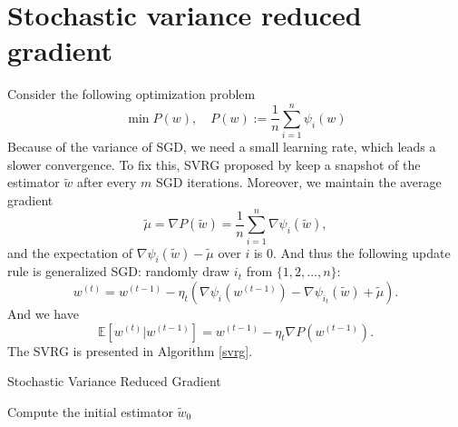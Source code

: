 \documentclass[12pt]{article}
\numberwithin{equation}{section}
\begin{document}
\section{Stochastic variance reduced gradient}
Consider the following optimization problem
\begin{equation}\label{5.1}
\min P(w), \quad P(w):=\frac{1}{n} \sum_{i=1}^{n} \psi_{i}(w)
\end{equation}
Because of the variance of SGD, we need a small learning rate, which leads a slower convergence. To fix this, SVRG proposed by \citet*{johnson2013accelerating} keep a snapshot of the estimator $\tilde{w}$ after every $m$ SGD iterations. Moreover, we maintain the average gradient 
\begin{equation*}
\tilde{\mu}=\nabla P(\tilde{w})=\frac{1}{n} \sum_{i=1}^{n} \nabla \psi_{i}(\tilde{w}),
\end{equation*}
and the expectation of $\nabla \psi_{i}(\tilde{w})-\tilde{\mu}$ over $i$ is 0. And thus the following update rule is generalized SGD: randomly draw $i_t$ from $\{1,2,...,n\}$:
\begin{equation}\label{svrg5}
w^{(t)}=w^{(t-1)}-\eta_{t}\left(\nabla \psi_{i}\left(w^{(t-1)}\right)-\nabla \psi_{i_{t}}(\tilde{w})+\tilde{\mu}\right).
\end{equation}
And we have
$$
\mathbb{E}\left[w^{(t)} | w^{(t-1)}\right]=w^{(t-1)}-\eta_{t} \nabla P\left(w^{(t-1)}\right).
$$
The SVRG is presented in Algorithm \ref{svrg}.
\IncMargin{1em} %
\begin{algorithm}[hbt!]
	\caption{Stochastic Variance Reduced Gradient\label{svrg}}
	\SetAlgoNoLine %
	
	\BlankLine
	Compute the initial estimator $\tilde{w}_0$\\
\end{algorithm}
\end{document}
